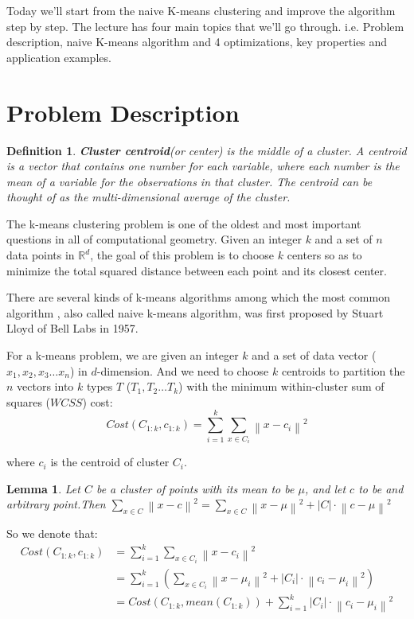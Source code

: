 \documentclass[11pt]{article}
\newtheorem{lemma}[theorem]{Lemma}
\newtheorem{definition}[theorem]{Definition}
\begin{document}
\par Today we'll start from the naive K-means clustering and improve the algorithm step by step. The lecture has four main topics that we'll go through. i.e. Problem description, naive K-means algorithm and 4 optimizations, key properties and application examples.

\section{Problem Description}
\begin{definition}
\textbf{Cluster centroid}(or center) is the middle of a cluster. A centroid is a vector that contains one number for each variable, where each number is the mean of a variable for the observations in that cluster. The centroid can be thought of as the multi-dimensional average of the cluster.
\end{definition}
\par The k-means clustering problem is one of the oldest and most important questions in all of computational geometry. Given an integer $k$ and a set of $n$ data points in $\mathbb{R}^{d}$, the goal of this problem is to choose $k$ centers so as to minimize the total squared distance between each point and its closest center.\cite{kmeanspp}
\par There are several kinds of k-means algorithms among which the most common algorithm , also called naive k-means algorithm, was first proposed by Stuart Lloyd\cite{Least-squares-quantization-in-PCM} of Bell Labs in 1957.
\par For a k-means problem, we are given an integer $k$ and a set of data vector ($x_1, x_2, x_3 \dots x_n$) in $d$-dimension. And we need to choose $k$ centroids to partition the $n$ vectors into $k$ types $T$ ($T_1, T_2 \dots T_k$) with the minimum within-cluster sum of squares ($WCSS$) cost:
$$Cost(C_{1:k}, c_{1:k}) = \sum_{i=1}^{k} \sum_{x \in C_i } {\left\lVert x - c _i \right\rVert }^2  $$
\par where $c_i$ is the centroid of cluster $C_i$.

\begin{lemma}
  Let $C$ be a cluster of points with its mean to be $\mu$, and let $c$ to be and arbitrary point.Then $\sum_{x \in C}{\left\lVert x - c\right\rVert}^2 = \sum_{x \in C}{\left\lVert x - \mu\right\rVert}^2 + \left\lvert C \right\rvert \cdot {\left\lVert c - \mu\right\rVert}^2 $
\end{lemma}
\par So we denote that:
\begin{equation*}
  \begin{split}
    Cost(C_{1:k}, c_{1:k}) & = \sum_{i=1}^{k} \sum_{x \in C_i } {\left\lVert x - c _i \right\rVert }^2 \\
    & = \sum_{i=1}^{k} (\sum_{x \in C_i} {\left\lVert x - \mu_i\right\rVert}^2 + \left\lvert C_i \right\rvert \cdot {\left\lVert c_i - \mu_i\right\rVert}^2) \\
    & = Cost(C_{1:k}, mean(C_{1:k})) + \sum_{i=1}^{k} {\left\lvert C_i\right\rvert }\cdot {\left\lVert c_i - \mu_i\right\rVert }^2
  \end{split}
\end{equation*}
\end{document}

